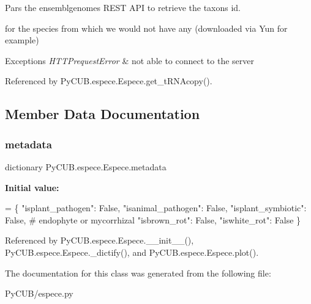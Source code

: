 Pars the ensemblgenomes R\+E\+ST A\+PI to retrieve the taxons id. 

for the species from which we would not have any (downloaded via Yun for example)


\begin{DoxyExceptions}{Exceptions}
{\em H\+T\+T\+Prequest\+Error} & not able to connect to the server \\
\hline
\end{DoxyExceptions}


Referenced by Py\+C\+U\+B.\+espece.\+Espece.\+get\+\_\+t\+R\+N\+Acopy().



\subsection{Member Data Documentation}
\mbox{\label{class_py_c_u_b_1_1espece_1_1_espece_a0a27801c75339436b18b7e865b890a00}} 
\subsubsection{\texorpdfstring{metadata}{metadata}}
{\footnotesize\ttfamily dictionary Py\+C\+U\+B.\+espece.\+Espece.\+metadata\hspace{0.3cm}{\ttfamily [static]}}

{\bfseries Initial value\+:}
\begin{DoxyCode}
=  \{
        \textcolor{stringliteral}{"isplant\_pathogen"}: \textcolor{keyword}{False},
        \textcolor{stringliteral}{"isanimal\_pathogen"}: \textcolor{keyword}{False},
        \textcolor{stringliteral}{"isplant\_symbiotic"}: \textcolor{keyword}{False},  \textcolor{comment}{# endophyte or mycorrhizal}
        \textcolor{stringliteral}{"isbrown\_rot"}: \textcolor{keyword}{False},
        \textcolor{stringliteral}{"iswhite\_rot"}: \textcolor{keyword}{False}
    \}
\end{DoxyCode}


Referenced by Py\+C\+U\+B.\+espece.\+Espece.\+\_\+\+\_\+init\+\_\+\+\_\+(), Py\+C\+U\+B.\+espece.\+Espece.\+\_\+dictify(), and Py\+C\+U\+B.\+espece.\+Espece.\+plot().



The documentation for this class was generated from the following file\+:\begin{DoxyCompactItemize}
\item 
Py\+C\+U\+B/espece.\+py\end{DoxyCompactItemize}
